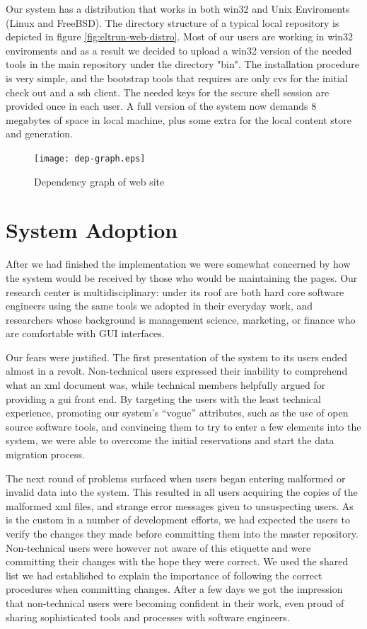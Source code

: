 \documentclass[10pt]{article}
\begin{document}
Our system has a distribution that works in both win32 and 
Unix Enviroments (Linux and FreeBSD). The directory structure of a typical local repository is depicted in
figure \ref{fig:eltrun-web-distro}.
Most of our users are working in win32 enviroments and as 
a result we decided to upload a win32 version of the needed tools 
in the main repository under the directory "bin". The installation procedure is very simple,
and the bootstrap tools that requires are only cvs for 
the initial check out and a ssh client. The needed keys 
for the secure shell session are provided once in each user. 
A full version of the system now demands 8 megabytes of space 
in local machine, plus some extra for the local content store and generation.

\begin{figure}
\texttt{[image: dep-graph.eps]}
\caption{Dependency graph of web site}
\label{fig:eltrun-web-m-dds-snapshot}
\end{figure}

\section{System Adoption}
\label{sec:adopt}
After we had finished the implementation we were somewhat concerned
by how the system would be received by those who would be
maintaining the pages.
Our research center is multidisciplinary: under its roof
are both hard core software engineers using the same tools
we adopted in their everyday work, and researchers whose
background is management science, marketing, or finance
who are comfortable with {\sc GUI} interfaces.

Our fears were justified.
The first presentation of the system to its users ended
almost in a revolt.
Non-technical users expressed their inability to comprehend
what an {\sc xml} document was, while technical members
helpfully argued for providing a {\sc gui} front end.
By targeting the users with the least technical experience,
promoting our system's ``vogue'' attributes,
such as the use of open source software tools,
and convincing them to try to enter a few elements into
the system, we were able to overcome the initial reservations
and start the data migration process.

The next round of problems surfaced when users began entering
malformed or invalid data into the system.
This resulted in all users acquiring the copies of the malformed
{\sc xml} files, and strange error messages given to unsuspecting
users.
As is the custom in a number of development efforts, we had
expected the users to verify the changes they made before
committing them into the master repository.
Non-technical users were however not aware of this etiquette
and were committing their changes with the hope they were correct.
We used the shared list we had established to explain the
importance of following the correct procedures when committing changes.
After a few days we got the impression that non-technical users
were becoming confident in their work, even proud of sharing
sophisticated tools and processes with software engineers.
\end{document}
